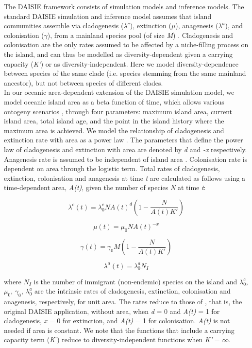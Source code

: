 \documentclass{article}
\begin{document}
The DAISIE framework consists of simulation models and inference models. The standard DAISIE simulation and inference model assumes that island communities assemble via cladogenesis ($\lambda^c$), extinction ($\mu$), anagenesis ($\lambda^a$), and colonisation ($\gamma$), from a mainland species pool (of size \textit{M}) \citep{valente_equilibrium_2015}. Cladogenesis and colonisation are the only rates assumed to be affected by a niche-filling process on the island, and can thus be modelled as diversity-dependent given a carrying capacity (\textit{K’}) \citep{etienne_diversity-dependence_2012, valente_equilibrium_2015} or as diversity-independent. Here we model diversity-dependence between species of the same clade (i.e. species stemming from the same mainland ancestor), but not between species of different clades. \\

In our oceanic area-dependent extension of the DAISIE simulation model, we model oceanic island area as a beta function of time, which allows various ontogeny scenarios \citep{valente_effects_2014}, through four parameters: maximum island area, current island area, total island age, and the point in the island history where the maximum area is achieved. We model the relationship of cladogenesis and extinction rate with area as a power law \citep{valente_simple_2020}. The parameters that define the power law of cladogenesis and extinction with area are denoted by \textit{d} and \textit{-x} respectively. Anagenesis rate is assumed to be independent of island area \citep{valente_simple_2020}. Colonisation rate is dependent on area through the logistic term. Total rates of cladogenesis, extinction, colonisation and anagenesis at time \textit{t} are calculated as follows using a time-dependent area, \textit{A(t)}, given the number of species \textit{N} at time \textit{t}:

\[ \lambda^c (t) = \lambda^c_0 N A(t)^d \left( 1- \frac{N}{A(t)K'} \right) \]

\[ \mu (t) = \mu_0 N A(t)^{-x} \]

\[ \gamma (t) = \gamma_0 M \left( 1- \frac{N}{A(t)K'} \right) \]
 
\[ \lambda^a (t) = \lambda^a_0 N_I \]

where $N_I$ is the number of immigrant (non-endemic) species on the island and $\lambda^c_0$, $\mu_0$, $\gamma_0$, $\lambda^a_0$ are the intrinsic rates of cladogenesis, extinction, colonisation and anagenesis, respectively, for unit area. The rates reduce to those of \cite{valente_equilibrium_2015}, that is, the original DAISIE application, without area, when \textit{d} = 0 and \textit{A(t)} = 1 for cladogenesis, \textit{x} = 0 for extinction, and \textit{A(t)} = 1 for colonisation. \textit{A(t)} is not needed if area is constant. We note that the functions that include a carrying capacity term (\textit{K’}) reduce to diversity-independent functions when \textit{K’} = $\infty$. \\
\end{document}
